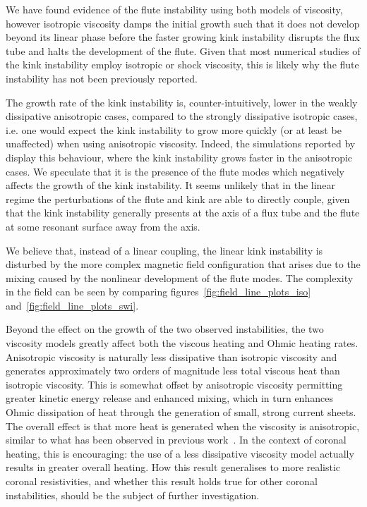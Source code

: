 \documentclass[fleqn,usenatbib]{mnras}
\newcommand{\rev}[1]{{\color{red} {#1}}}
\newcommand{\newold}[2]{{#1}{}}
\begin{document}
\rev{We have found evidence of the flute instability using both models of
viscosity, however isotropic viscosity damps the initial growth such that it
does not develop beyond its linear phase before the faster growing kink
instability disrupts the flux tube and halts the development of the flute.
Given that most numerical studies of the kink instability employ isotropic or
shock viscosity, this is likely why the flute instability has not been
previously reported.}

\rev{The growth rate of the kink instability is, counter-intuitively, lower in the
weakly dissipative anisotropic cases, compared to the strongly dissipative
isotropic cases, i.e. one would expect the kink instability to grow more
quickly (or at least be unaffected) when using anisotropic viscosity. Indeed,
the simulations reported by~\citet{quinnEffectAnisotropicViscosity2020} display
this behaviour, where the kink instability grows \newold{}{(marginally)} faster in the
anisotropic cases. We speculate that it is the presence of the flute modes which
negatively affects the growth of the kink instability.} {It seems unlikely that
in the linear regime the perturbations of the flute and kink are able to
directly couple, given that the kink instability generally presents at the axis
of a flux tube and the flute at some resonant surface away from the
axis.} \rev{We believe that, instead of a linear coupling, the linear kink instability is
disturbed by the more complex magnetic field configuration that arises due to
the mixing caused by the nonlinear development of the flute modes. The
complexity in the field can be seen by comparing
figures~\ref{fig:field_line_plots_iso} and~\ref{fig:field_line_plots_swi}.

Beyond the effect on the growth of the two observed instabilities, the two
viscosity models greatly affect both the viscous heating and Ohmic heating
rates. Anisotropic viscosity is naturally less dissipative than isotropic
viscosity and generates approximately two orders of magnitude less total
viscous heat than isotropic viscosity. This is somewhat offset by anisotropic
viscosity permitting greater kinetic energy release and enhanced mixing, which
in turn enhances Ohmic dissipation of heat through the generation of small,
strong current sheets. The overall effect is that more heat is generated when
the viscosity is anisotropic, similar to what has been observed in previous
work~\citep{quinnEffectAnisotropicViscosity2020}. In the context of
coronal heating, this is encouraging: the use of a less dissipative viscosity
model actually results in greater overall heating. How this result generalises
to more realistic coronal resistivities, and whether this result holds true for
other coronal instabilities, should be the subject of further investigation.}
\end{document}
